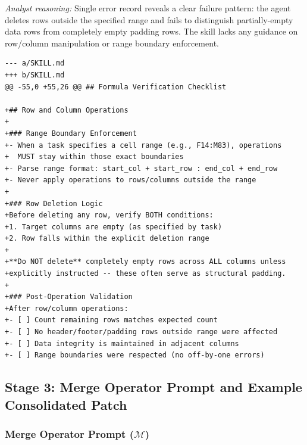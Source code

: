 \begin{tcolorbox}[
    title={\textbf{Example Stage 2 Trajectory-Level Patch (error analyst, one trajectory)}},
    colback=orange!3, colframe=orange!40, fonttitle=\small\bfseries,
    breakable, left=4pt, right=4pt, top=4pt, bottom=4pt
]
\small
\textit{Analyst reasoning:} Single error record reveals a clear failure pattern: the agent deletes rows outside the specified range and fails to distinguish partially-empty data rows from completely empty padding rows. The skill lacks any guidance on row/column manipulation or range boundary enforcement.

\medskip
\begin{lstlisting}[style=appendixprompt]
--- a/SKILL.md
+++ b/SKILL.md
@@ -55,0 +55,26 @@ ## Formula Verification Checklist

+## Row and Column Operations
+
+### Range Boundary Enforcement
+- When a task specifies a cell range (e.g., F14:M83), operations
+  MUST stay within those exact boundaries
+- Parse range format: start_col + start_row : end_col + end_row
+- Never apply operations to rows/columns outside the range
+
+### Row Deletion Logic
+Before deleting any row, verify BOTH conditions:
+1. Target columns are empty (as specified by task)
+2. Row falls within the explicit deletion range
+
+**Do NOT delete** completely empty rows across ALL columns unless
+explicitly instructed -- these often serve as structural padding.
+
+### Post-Operation Validation
+After row/column operations:
+- [ ] Count remaining rows matches expected count
+- [ ] No header/footer/padding rows outside range were affected
+- [ ] Data integrity is maintained in adjacent columns
+- [ ] Range boundaries were respected (no off-by-one errors)
\end{lstlisting}
\end{tcolorbox}

\subsection{Stage 3: Merge Operator Prompt and Example Consolidated Patch}
\label{app:stage3_prompts}

\subsubsection{Merge Operator Prompt ($\mathcal{M}$)}

